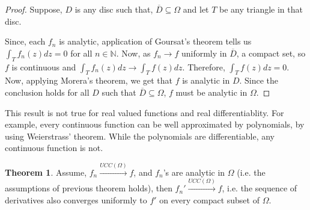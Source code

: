 \documentclass[12pt]{article}
\newcommand{\N}{\mathbb{N}}
\theoremstyle{definition}
\newtheorem{thm}{Theorem}
\newenvironment{theorem}{
\begin{tcolorbox}[colback=green!5!white,colframe=green!75!black, parbox = false]\begin{thm} }{\end{thm}\end{tcolorbox} }
\newenvironment{note}{
\begin{tcolorbox}[colback=blue!5!white,colframe=blue!75!black,title=Note, parbox = false] }{\end{tcolorbox} }
\begin{document}
\begin{proof}
    Suppose, $D$ is any disc such that, $\overline{D} \subseteq \Omega$ and let $T$ be any triangle in that disc. 

    Since, each $f_n$ is analytic, application of Goursat's theorem tells us $\int_T f_n(z)dz = 0$ for all $n \in \N$. Now, as $f_n \rightarrow f$ uniformly in $\overline{D}$, a compact set, so $f$ is continuous and $\int_T f_n(z)dz \rightarrow \int_T f(z)dz$. Therefore, $\int_T f(z)dz = 0$. Now, applying Morera's theorem, we get that $f$ is analytic in $D$. Since the conclusion holds for all $D$ such that $\overline{D} \subseteq \Omega$, $f$ must be analytic in $\Omega$.  
\end{proof}

\begin{note}
    This result is not true for real valued functions and real differentiablity. For example, every continuous function can be well approximated by polynomials, by using Weierstrass' theorem. While the polynomials are differentiable, any continuous function is not.
\end{note}

\begin{theorem}
    Assume, $f_n \xrightarrow{UCC(\Omega)} f$, and $f_n$'s are analytic in $\Omega$ (i.e. the assumptions of previous theorem holds), then $f_n' \xrightarrow{UCC(\Omega)} f$, i.e. the sequence of derivatives also converges uniformly to $f'$ on every compact subset of $\Omega$.
\end{theorem}
\end{document}
